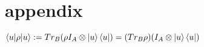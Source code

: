 \section{\large appendix}

$\braket{u|\rho|u} := Tr_B (\rho I_A \otimes  \ket{u} \bra{u} )
= (Tr_B \rho) (I_A \otimes \ket{u} \bra{u})$

